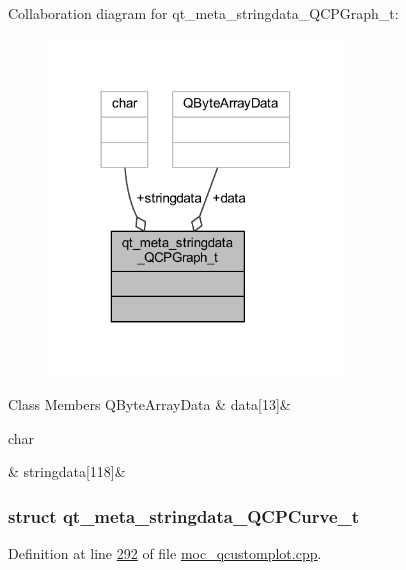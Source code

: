 Collaboration diagram for qt\+\_\+meta\+\_\+stringdata\+\_\+\+Q\+C\+P\+Graph\+\_\+t\+:
\nopagebreak
\begin{figure}[H]
\begin{center}
\leavevmode
\includegraphics[width=222pt]{dd/da7/a00168}
\end{center}
\end{figure}
\begin{DoxyFields}{Class Members}
\hypertarget{a00016_a52173b02d8396dce2aa3a046123398ea}{Q\+Byte\+Array\+Data}\label{a00016_a52173b02d8396dce2aa3a046123398ea}
&
data\mbox{[}13\mbox{]}&
\\
\hline

\hypertarget{a00016_a8d599799df5356cb10dc7a790a0e26a2}{char}\label{a00016_a8d599799df5356cb10dc7a790a0e26a2}
&
stringdata\mbox{[}118\mbox{]}&
\\
\hline

\end{DoxyFields}
\label{d9/dcc/a00102}
\hypertarget{a00016_d9/dcc/a00102}{}
\subsubsection{struct qt\+\_\+meta\+\_\+stringdata\+\_\+\+Q\+C\+P\+Curve\+\_\+t}


Definition at line \hyperlink{a00016_source_l00292}{292} of file \hyperlink{a00016_source}{moc\+\_\+qcustomplot.\+cpp}.



